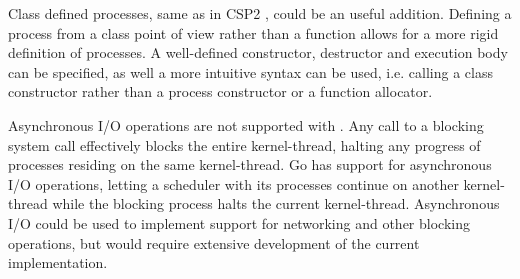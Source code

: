 Class defined processes, same as in \Cpp{}CSP2 \citep{brown2007c++csp2}, could be an useful addition. Defining a process from a class point of view rather than a function allows for a more rigid definition of processes. A well\hyp{}defined constructor, destructor and execution body can be specified, as well a more intuitive syntax can be used, i.e. calling a class constructor rather than a process constructor or a function allocator.

Asynchronous I/O operations are not supported with \Proxc{}. Any call to a blocking system call effectively blocks the entire kernel\hyp{}thread, halting any progress of processes residing on the same kernel\hyp{}thread. Go has support for asynchronous I/O operations, letting a scheduler with its processes continue on another kernel\hyp{}thread while the blocking process halts the current kernel\hyp{}thread. Asynchronous I/O could be used to implement support for networking and other blocking operations, but would require extensive development of the current implementation.


